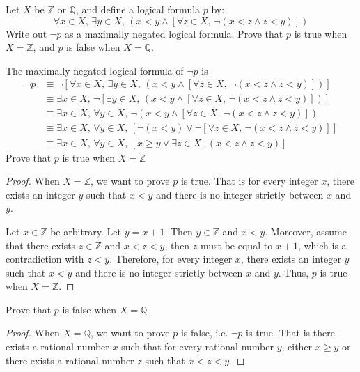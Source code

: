 \begin{chapex}
Let $X$ be $\mathbb{Z}$ or $\mathbb{Q}$, and define a logical formula $p$ by:
$$\forall x \in X,\, \exists y \in X,\, (x<y \wedge [\forall z \in X,\, \neg (x<z \wedge z<y)])$$
Write out $\neg p$ as a maximally negated logical formula. Prove that $p$ is true when $X = \mathbb{Z}$, and $p$ is false when $X = \mathbb{Q}$.
\end{chapex}

\begin{mysolution}
    The maximally negated logical formula of $\neg p$ is
    \begin{align*}
        \neg p & \equiv \neg [\forall x \in X,\, \exists y \in X,\, (x<y \wedge [\forall z \in X,\, \neg (x<z \wedge z<y)])]\\
        & \equiv \exists x \in X,\, \neg [\exists y \in X,\, (x<y \wedge [\forall z \in X,\, \neg (x<z \wedge z<y)])]\\
        & \equiv \exists x \in X,\, \forall y \in X,\, \neg (x<y \wedge [\forall z \in X,\, \neg (x<z \wedge z<y)])\\
        & \equiv \exists x \in X,\, \forall y \in X,\, [\neg (x<y) \vee \neg [\forall z \in X,\, \neg (x<z \wedge z<y)]]\\
        & \equiv \exists x \in X,\, \forall y \in X,\, [x \ge y \vee \exists z \in X,\, (x<z \wedge z<y)]
    \end{align*}
    Prove that $p$ is true when $X = \mathbb{Z}$
    \begin{proof}
        When $X = \mathbb{Z}$, we want to prove $p$ is true. That is for every integer $x$, there exists an integer $y$ such that $x<y$ and there is no integer strictly between $x$ and $y$.
        
        Let $x \in \mathbb{Z}$ be arbitrary. Let $y = x + 1$. Then $y \in \mathbb{Z}$ and $x < y$. Moreover, assume that there exists $z \in \mathbb{Z}$ and $x < z < y$, then $z$ must be equal to $x+1$, which is a contradiction with $z < y$. Therefore, for every integer $x$, there exists an integer $y$ such that $x<y$ and there is no integer strictly between $x$ and $y$. Thus, $p$ is true when $X = \mathbb{Z}$.
    \end{proof}
    Prove that $p$ is false when $X = \mathbb{Q}$
    \begin{proof}
        When $X = \mathbb{Q}$, we want to prove $p$ is false, i.e. $\neg p$ is true. That is there exists a rational number $x$ such that for every rational number $y$, either $x \ge y$ or there exists a rational number $z$ such that $x < z < y$.


\end{proof}
\end{mysolution}
